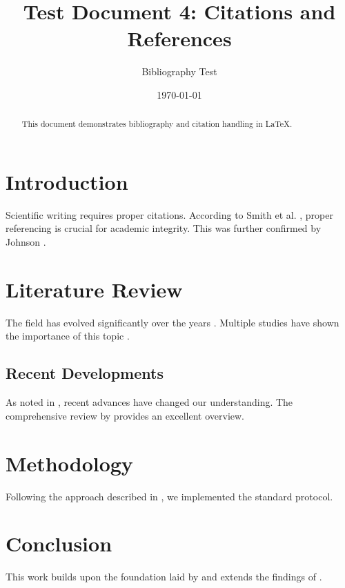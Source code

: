 \documentclass[12pt]{article}
\title{Test Document 4: Citations and References}
\author{Bibliography Test}
\date{\today}
\begin{document}
\maketitle

\begin{abstract}
This document demonstrates bibliography and citation handling in LaTeX.
\end{abstract}

\section{Introduction}
Scientific writing requires proper citations. According to Smith et al. \cite{smith2020}, proper referencing is crucial for academic integrity. This was further confirmed by Johnson \cite{johnson2021}.

\section{Literature Review}
The field has evolved significantly over the years \cite{brown2019, davis2020}. Multiple studies have shown the importance of this topic \cite{wilson2018, taylor2022}.

\subsection{Recent Developments}
As noted in \cite{anderson2023}, recent advances have changed our understanding. The comprehensive review by \cite{thompson2022} provides an excellent overview.

\section{Methodology}
Following the approach described in \cite{martinez2021}, we implemented the standard protocol.

\section{Conclusion}
This work builds upon the foundation laid by \cite{garcia2020} and extends the findings of \cite{rodriguez2019}.
\end{document}
